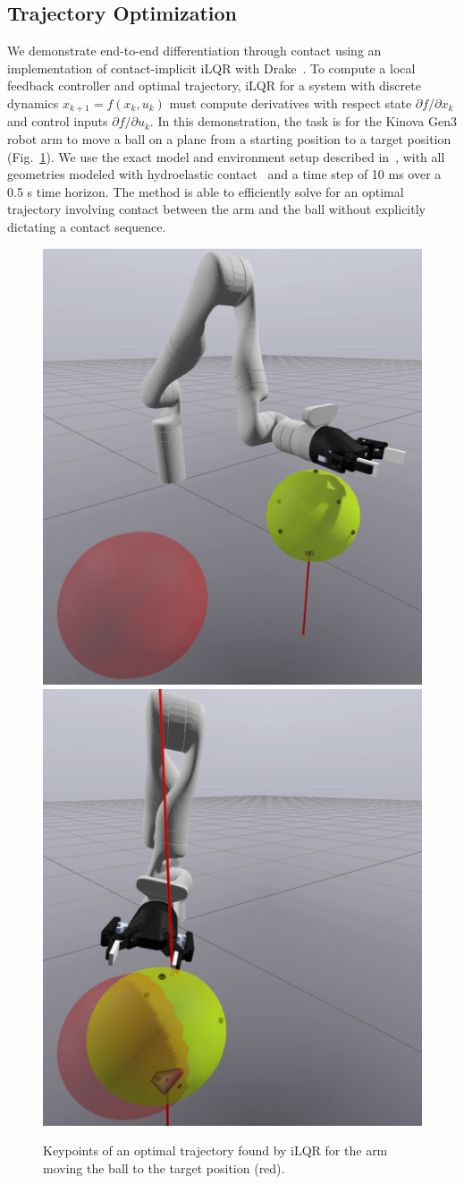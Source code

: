 \subsection{Trajectory Optimization}
\label{sec:trajopt}

We demonstrate end-to-end differentiation through contact using an
implementation of contact-implicit iLQR with Drake~\cite{bib:kurtz2022contact}.
To compute a local feedback controller and optimal trajectory, iLQR for a system
with discrete dynamics $x_{k+1} = f(x_k, u_k)$ must compute derivatives with
respect state $\partial f/\partial x_k$ and control inputs $\partial f/\partial
u_k$. In this demonstration, the task is for the Kinova Gen3 robot arm to move a
ball on a plane from a starting position to a target position
(Fig.~\ref{fig:kinova_gen3}). We use the exact model and environment setup
described in~\cite{bib:kurtz2022contact}, with all geometries modeled with
hydroelastic contact~\cite{bib:elandt2019pressure} and a time step of 10 ms over
a 0.5 s time horizon. The method is able to efficiently solve for an optimal
trajectory involving contact between the arm and the ball without explicitly
dictating a contact sequence.

\begin{figure}[!h]
    \centering
    \includegraphics[width=0.49\columnwidth]{figures/TestCases/iLQR/kinova0.png}
    \includegraphics[width=0.49\columnwidth]{figures/TestCases/iLQR/kinova1.png}
    \caption{Keypoints of an optimal trajectory found by iLQR for the arm moving the ball to the target position (red).}
    \label{fig:kinova_gen3}
\end{figure}